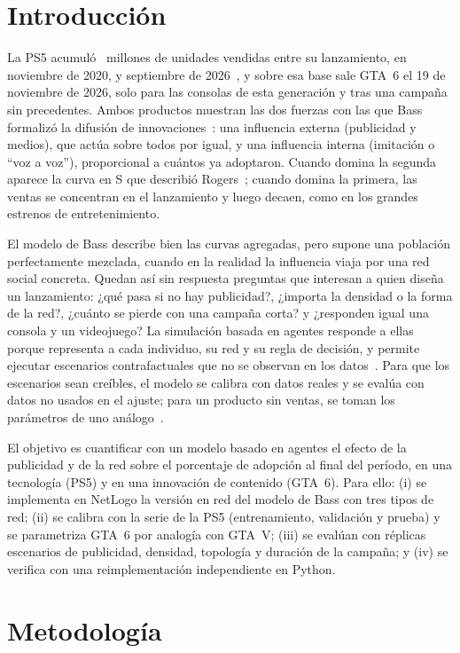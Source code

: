 \documentclass[runningheads]{llncs}
\begin{document}
\section{Introducción}

La PS5 acumuló \cifraPsUnidadesFin\ millones de unidades vendidas entre su lanzamiento, en noviembre de 2020, y septiembre de 2026~\cite{sony2026}, y sobre esa base sale GTA~6 el 19 de noviembre de 2026, solo para las consolas de esta generación y tras una campaña sin precedentes. Ambos productos muestran las dos fuerzas con las que Bass formalizó la difusión de innovaciones~\cite{bass1969}: una influencia externa (publicidad y medios), que actúa sobre todos por igual, y una influencia interna (imitación o ``voz a voz''), proporcional a cuántos ya adoptaron. Cuando domina la segunda aparece la curva en S que describió Rogers~\cite{rogers2003}; cuando domina la primera, las ventas se concentran en el lanzamiento y luego decaen, como en los grandes estrenos de entretenimiento.

El modelo de Bass describe bien las curvas agregadas, pero supone una población perfectamente mezclada, cuando en la realidad la influencia viaja por una red social concreta. Quedan así sin respuesta preguntas que interesan a quien diseña un lanzamiento: ¿qué pasa si no hay publicidad?, ¿importa la densidad o la forma de la red?, ¿cuánto se pierde con una campaña corta? y ¿responden igual una consola y un videojuego? La simulación basada en agentes responde a ellas porque representa a cada individuo, su red y su regla de decisión, y permite ejecutar escenarios contrafactuales que no se observan en los datos~\cite{goldenberg2001}. Para que los escenarios sean creíbles, el modelo se calibra con datos reales y se evalúa con datos no usados en el ajuste; para un producto sin ventas, se toman los parámetros de uno análogo~\cite{thomas1985}.

El objetivo es cuantificar con un modelo basado en agentes el efecto de la publicidad y de la red sobre el porcentaje de adopción al final del período, en una tecnología (PS5) y en una innovación de contenido (GTA~6). Para ello: (i) se implementa en NetLogo la versión en red del modelo de Bass con tres tipos de red; (ii) se calibra con la serie de la PS5 (entrenamiento, validación y prueba) y se parametriza GTA~6 por analogía con GTA~V; (iii) se evalúan con réplicas escenarios de publicidad, densidad, topología y duración de la campaña; y (iv) se verifica con una reimplementación independiente en Python.

\section{Metodología}
\label{sec:metodologia}
\end{document}
